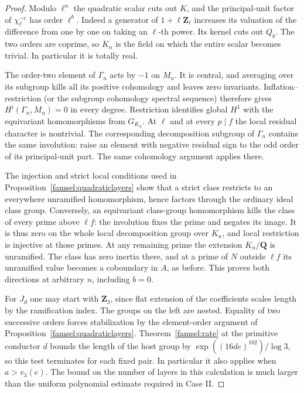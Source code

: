 \begin{proof}
Modulo \(\ell^n\) the quadratic scalar cuts out \(K\), and the
principal-unit factor of \(\chi_\ell^{-e}\) has order \(\ell^b\).
Indeed a generator of \(1+\ell\mathbf Z_\ell\) increases its
valuation of the difference from one by one on taking an \(\ell\)-th
power. Its kernel cuts out \(Q_b\). The two orders are coprime,
so \(K_n\) is the field on which the entire scalar becomes trivial.
In particular it is totally real.

The order-two element of \(\Gamma_n\) acts by \(-1\) on \(M_n\).
It is central, and averaging over its subgroup kills all its
positive cohomology and leaves zero invariants. Inflation--restriction
(or the subgroup cohomology spectral sequence) therefore gives
\(H^i(\Gamma_n,M_n)=0\) in every degree. Restriction identifies
global \(H^1\) with the equivariant homomorphisms from \(G_{K_n}\).
At \(\ell\) and at every \(p\mid f\) the local residual character
is nontrivial. The corresponding decomposition subgroup of
\(\Gamma_n\) contains the same involution: raise an element with
negative residual sign to the odd order of its principal-unit part.
The same cohomology argument applies there.

The injection and strict local conditions used in
Proposition~\ref{famsel:quadraticlayers} show that a strict class
restricts to an everywhere unramified homomorphism, hence factors
through the ordinary ideal class group. Conversely, an equivariant
class-group homomorphism kills the class of every prime above
\(\ell f\): the involution fixes the prime and negates its image.
It is thus zero on the whole local decomposition group over \(K_n\),
and local restriction is injective at those primes. At any remaining
prime the extension \(K_n/\mathbf Q\) is unramified. The class has
zero inertia there, and at a prime of \(N\) outside \(\ell f\) its
unramified value becomes a coboundary in \(A\), as before. This
proves both directions at arbitrary \(n\), including \(b=0\).

For \(J_d\) one may start with \(\mathbf Z_3\), since flat extension
of the coefficients scales length by the ramification index. The
groups on the left are nested. Equality of two successive orders
forces stabilization by the element-order argument of
Proposition~\ref{famsel:quadraticlayers}. Theorem~\ref{famsel:rate}
at the primitive conductor \(d\) bounds the length of the host group
by \(\exp((16de)^{102})/\log 3\), so this test terminates for each
fixed pair. In particular it also applies when \(a>v_3(e)\).
The bound on the number of layers in this calculation is much
larger than the uniform polynomial estimate required in Case II.
\end{proof}

